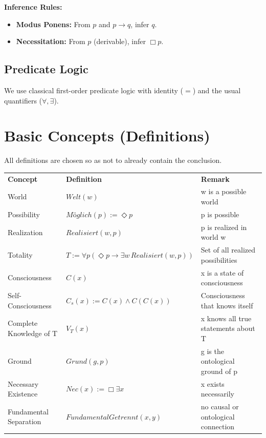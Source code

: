 \documentclass[
]{article}
\begin{document}
\textbf{Inference Rules:}
\begin{itemize}
\item \textbf{Modus Ponens:} From \(p\) and \(p \rightarrow q\), infer \(q\).
\item \textbf{Necessitation:} From \(p\) (derivable), infer \(\Box p\).
\end{itemize}

\subsection{Predicate Logic}\label{predicate-logic}

We use classical first-order predicate logic with identity (\(=\)) and the usual quantifiers (\(\forall, \exists\)).

\section{Basic Concepts (Definitions)}\label{basic-concepts-definitions}

All definitions are chosen so as not to already contain the conclusion.

\begin{tabular}{lll}
\textbf{Concept} & \textbf{Definition} & \textbf{Remark} \\
World & \(Welt(w)\) & w is a possible world \\
Possibility & \(Möglich(p) := \Diamond p\) & p is possible \\
Realization & \(Realisiert(w,p)\) & p is realized in world w \\
Totality & \(T := \forall p(\Diamond p \rightarrow \exists w\, Realisiert(w,p))\) & Set of all realized possibilities \\
Consciousness & \(C(x)\) & x is a state of consciousness \\
Self-Consciousness & \(C_s(x) := C(x) \land C(C(x))\) & Consciousness that knows itself \\
Complete Knowledge of T & \(V_T(x)\) & x knows all true statements about T \\
Ground & \(Grund(g,p)\) & g is the ontological ground of p \\
Necessary Existence & \(Nec(x) := \Box \exists x\) & x exists necessarily \\
Fundamental Separation & \(FundamentalGetrennt(x,y)\) & no causal or ontological connection \\
\end{tabular}
\end{document}
